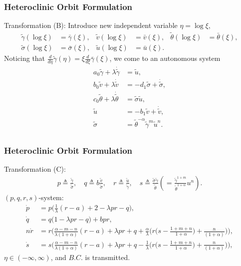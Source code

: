 \documentclass{beamer}
\def\bg{{\bar{\gamma}}}
\def\bv{{\bar{v}}}
\def\bth{{\bar{\theta}}}
\def\bs{{\bar{\sigma}}}
\def\bu{{\bar{u}}}
\def\tg{{\tilde{\gamma}}}
\def\tv{{\tilde{v}}}
\def\tth{{\tilde{\theta}}}
\def\ts{{\tilde{\sigma}}}
\def\tu{{\tilde{u}}}
\def\dtg{{\dot{\tilde{\gamma}}}}
\def\dtv{{\dot{\tilde{v}}}}
\def\dtth{{\dot{\tilde{\theta}}}}
\def\dts{{\dot{\tilde{\sigma}}}}
\begin{document}
\begin{frame}
 \frametitle{Heteroclinic Orbit Formulation}
 Transformation (B): Introduce new independent variable $\eta=\log\xi$,
\begin{equation} \label{eq:BARtoTIL}
\begin{aligned}
 \tg(\log\xi)&=\bg(\xi), &
 \tv(\log\xi)&=\bv(\xi), &
 \tth(\log\xi)&=\bth(\xi), \\
 \ts(\log\xi)&=\bs(\xi), &
 \tu(\log\xi)&=\bu(\xi).
\end{aligned}
\end{equation}
Noticing that $\frac{d}{d\eta}\tg(\eta) = \xi \frac{d}{d\xi}\bg(\xi)$, we come to an autonomous system
\begin{equation} \label{eq:tildesys}
 \begin{aligned}
  a_0\tg + \lambda\dtg &=\tu,\\
  b_0\tv + \lambda\dtv &=-d_1 \ts + \dts,\\
  c_0\tth+ \lambda\dtth&=\ts\tu,\\
  \tu&=-b_1\tv+\dtv,\\
    \ts &=\tth^{-\alpha}\tg^m\tu^n.\\
 \end{aligned}
\end{equation}
\end{frame}

\begin{frame}
 \frametitle{Heteroclinic Orbit Formulation}
 Transformation (C): 
\begin{equation}\label{eq:pqrdef}
 \begin{aligned}
  p \triangleq \frac{\tg}{\ts}, \quad q \triangleq  b \frac{\tv}{\ts},  \quad r \triangleq  \frac{\tu}{\tg}, \quad s \triangleq  \frac{\ts\tg}{\tth}\left(=\frac{\tg^{1+m}}{\tth^{1+\alpha}}u^n\right).
 \end{aligned}
\end{equation}
$(p,q,r,s)$-system:{\scriptsize
\begin{equation}\label{eq:slow}
 \begin{aligned}
 \dot{p} &=p\Big(\frac{1}{\lambda}(r-a) + 2- \lambda p r -q\Big),\\
 \dot{q} &=q\Big(1 -\lambda p r -q\Big) + b p r,\\
 n\dot{r} &=r\Big(\frac{\alpha-m-n}{\lambda(1+\alpha)}(r-a) + \lambda pr + q +\frac{\alpha}{\lambda}\Big(r\big(s- \frac{1+m+n}{1+\alpha}\big) + \frac{n}{(1+\alpha)}\Big)\Big),\\
 \dot{s} &=s\Big(\frac{\alpha-m-n}{\lambda(1+\alpha)}(r-a) + \lambda pr + q - \frac{1}{\lambda}\Big(r\big(s- \frac{1+m+n}{1+\alpha}\big) + \frac{n}{(1+\alpha)}\Big)\Big),
 \end{aligned}
\end{equation}}
$\eta\in (-\infty,\infty)$, and ${B.C.}$ is transmitted.
\end{frame}
\end{document}
